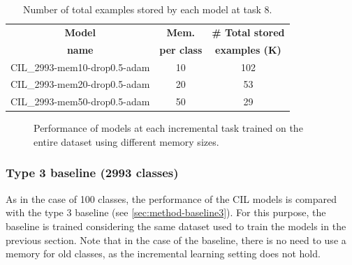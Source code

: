\begin{table}[H]
    \centering
    \begin{tabular}{c|c|c}
        \hline
        \textbf{Model} &
        \textbf{Mem.} &
        \textbf{\# Total stored} \\
        \textbf{name} &
        \textbf{per class} &
        \textbf{examples (K)} \\
        \hline
        \hline
CIL\_2993-mem10-drop0.5-adam&10&102\\
CIL\_2993-mem20-drop0.5-adam&20&53\\
CIL\_2993-mem50-drop0.5-adam&50&29\\
        \hline
    \end{tabular}
    \caption{Number of total examples stored by each model at task 8.}
    \label{table:exp6-memsize}
\end{table}


\begin{figure}[H]
	\centering
	\caption{Performance of models at each incremental task trained on the entire dataset using different memory sizes.}%
	\label{fig:exp6}%
\end{figure}


\subsubsection{Type 3 baseline (2993 classes)}
As in the case of 100 classes, the performance of the CIL models is compared with the type 3 baseline (see \autoref{sec:method-baseline3}).
For this purpose, the baseline is trained considering the same dataset used to train the models in the previous section.
Note that in the case of the baseline, there is no need to use a memory for old classes, as the incremental learning setting does not hold.
 

